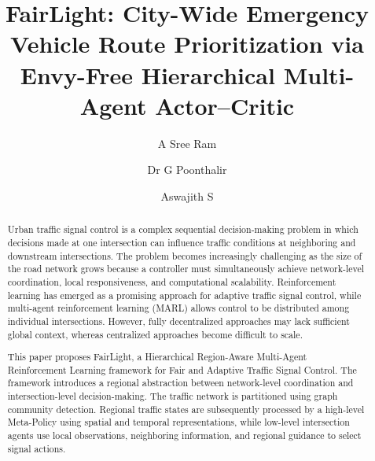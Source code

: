 \documentclass[3p,times]{elsarticle}
\theoremstyle{plain}
\theoremstyle{definition}
\begin{document}
\begin{frontmatter}


\title{FairLight: City-Wide Emergency Vehicle Route Prioritization
via Envy-Free Hierarchical Multi-Agent Actor--Critic}

\author{A Sree Ram}
\author{Dr G Poonthalir}
\author{Aswajith S}




\begin{abstract}

Urban traffic signal control is a complex sequential decision-making
problem in which decisions made at one intersection can influence
traffic conditions at neighboring and downstream intersections. The
problem becomes increasingly challenging as the size of the road
network grows because a controller must simultaneously achieve
network-level coordination, local responsiveness, and computational
scalability. Reinforcement learning has emerged as a promising approach
for adaptive traffic signal control, while multi-agent reinforcement
learning (MARL) allows control to be distributed among individual
intersections. However, fully decentralized approaches may lack
sufficient global context, whereas centralized approaches become
difficult to scale.

This paper proposes FairLight, a Hierarchical
Region-Aware Multi-Agent Reinforcement Learning framework for Fair and
Adaptive Traffic Signal Control. The framework introduces a regional
abstraction between
network-level coordination and intersection-level decision-making.
The traffic network is partitioned using graph community detection.
Regional traffic states are subsequently processed by a high-level
Meta-Policy using spatial and temporal representations, while low-level
intersection agents use local observations, neighboring information,
and regional guidance to select signal actions.


\end{abstract}
\end{frontmatter}
\end{document}

